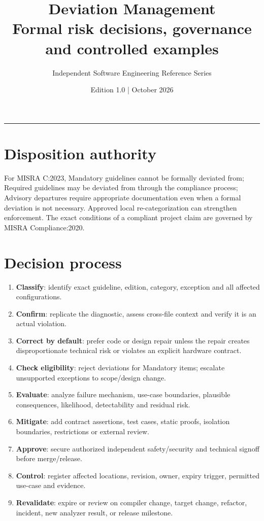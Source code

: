 \documentclass[10pt,letterpaper]{article}
\title{\vspace{-2.3em}\color{DeepNavy}\Huge\bfseries Deviation Management\\[0.45em]\large\normalfont\color{Teal} Formal risk decisions, governance and controlled examples}
\author{Independent Software Engineering Reference Series}
\date{Edition 1.0 \quad | \quad October 2026}
\begin{document}
\maketitle
\vspace{-0.4em}
\begin{center}\color{Slate}\rule{0.83\linewidth}{0.4pt}\end{center}
\DocNotes
\tableofcontents
\newpage

\section{Disposition authority}
For MISRA C:2023, Mandatory guidelines cannot be formally deviated from; Required guidelines may be deviated from through the compliance process; Advisory departures require appropriate documentation even when a formal deviation is not necessary. Approved local re-categorization can strengthen enforcement. The exact conditions of a compliant project claim are governed by MISRA Compliance:2020.
\section{Decision process}
\begin{enumerate}
\item \textbf{Classify}: identify exact guideline, edition, category, exception and all affected configurations.
\item \textbf{Confirm}: replicate the diagnostic, assess cross-file context and verify it is an actual violation.
\item \textbf{Correct by default}: prefer code or design repair unless the repair creates disproportionate technical risk or violates an explicit hardware contract.
\item \textbf{Check eligibility}: reject deviations for Mandatory items; escalate unsupported exceptions to scope/design change.
\item \textbf{Evaluate}: analyze failure mechanism, use-case boundaries, plausible consequences, likelihood, detectability and residual risk.
\item \textbf{Mitigate}: add contract assertions, test cases, static proofs, isolation boundaries, restrictions or external review.
\item \textbf{Approve}: secure authorized independent safety/security and technical signoff before merge/release.
\item \textbf{Control}: register affected locations, revision, owner, expiry trigger, permitted use-case and evidence.
\item \textbf{Revalidate}: expire or review on compiler change, target change, refactor, incident, new analyzer result, or release milestone.
\end{enumerate}
\end{document}
